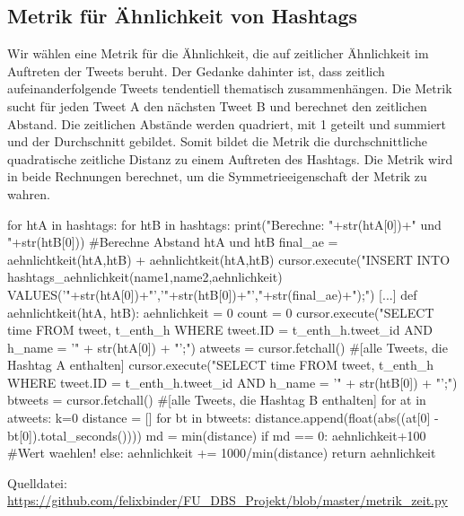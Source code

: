 \documentclass[BCOR0mm,fontsize=12pt,paper=a4,final,numbers=noenddot]{scrartcl}
\begin{document}
\subsection{Metrik für Ähnlichkeit von Hashtags}
Wir wählen eine Metrik für die Ähnlichkeit, die auf zeitlicher Ähnlichkeit im Auftreten der Tweets beruht. Der Gedanke dahinter ist, dass zeitlich aufeinanderfolgende Tweets tendentiell thematisch zusammenhängen. Die Metrik sucht für jeden Tweet A den nächsten Tweet B und berechnet den zeitlichen Abstand. Die zeitlichen Abstände werden quadriert, mit 1 geteilt und summiert und der Durchschnitt gebildet. Somit bildet die Metrik die durchschnittliche quadratische zeitliche Distanz zu einem Auftreten des Hashtags. Die Metrik wird in beide Rechnungen berechnet, um die Symmetrieeigenschaft der Metrik zu wahren.
\begin{python}
[...]
    for htA in hashtags:
        for htB in hashtags:
            print("Berechne: "+str(htA[0])+" und "+str(htB[0]))
        #Berechne Abstand htA und htB 
            final_ae = aehnlichtkeit(htA,htB) + aehnlichtkeit(htA,htB)
            cursor.execute("INSERT INTO hashtags_aehnlichkeit(name1,name2,aehnlichkeit) VALUES('"+str(htA[0])+"','"+str(htB[0])+"',"+str(final_ae)+");")
   [...]
def aehnlichtkeit(htA, htB):
    aehnlichkeit = 0
    count = 0
    cursor.execute("SELECT time FROM tweet, t_enth_h WHERE tweet.ID = t_enth_h.tweet_id AND h_name = '" + str(htA[0]) + "';")
    atweets = cursor.fetchall() #[alle Tweets, die Hashtag A enthalten]
    cursor.execute("SELECT time FROM tweet, t_enth_h WHERE tweet.ID = t_enth_h.tweet_id AND h_name = '" + str(htB[0]) + "';")
    btweets = cursor.fetchall() #[alle Tweets, die Hashtag B enthalten]
    for at in atweets:
        k=0
        distance = []
        for bt in btweets:
            distance.append(float(abs((at[0] - bt[0]).total_seconds())))
        md = min(distance)
        if md == 0:
            aehnlichkeit+100 #Wert waehlen!
        else: 
            aehnlichkeit += 1000/min(distance)
    return aehnlichkeit
\end{python}
Quelldatei: \url{https://github.com/felixbinder/FU_DBS_Projekt/blob/master/metrik_zeit.py}
\end{document}
